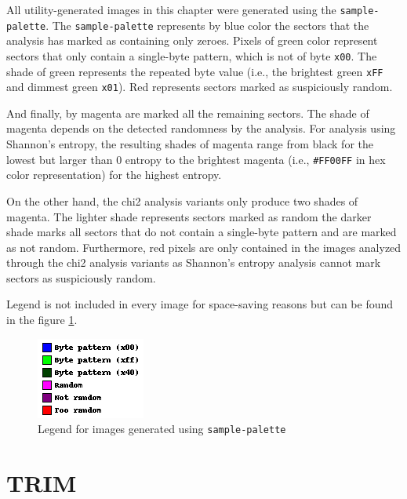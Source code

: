 \documentclass[
  digital, %
  oneside, %
  lof,     %
  lot,     %
]{fithesis4}
\begin{document}
All utility-generated images in this chapter were generated using the \texttt{sample-palette}.
The \texttt{sample-palette} represents by blue color the sectors that the analysis has marked as containing only zeroes.
Pixels of green color represent sectors that only contain a single-byte pattern, which is not of byte \texttt{x00}.
The shade of green represents the repeated byte value (i.e., the brightest green \texttt{xFF} and dimmest green \texttt{x01}).
Red represents sectors marked as suspiciously random. 

And finally, by magenta are marked all the remaining sectors. The shade of magenta depends on the detected randomness by the analysis. For analysis using Shannon's entropy, the resulting shades of magenta range from black for the lowest but larger than 0 entropy to the brightest magenta (i.e., \texttt{\#FF00FF} in hex color representation) for the highest entropy. 

On the other hand, the chi2 analysis variants only produce two shades of magenta. The lighter shade represents sectors marked as random the darker shade marks all sectors that do not contain a single-byte pattern and are marked as not random. Furthermore, red pixels are only contained in the images analyzed through the chi2 analysis variants as Shannon's entropy analysis cannot mark sectors as suspiciously random.

Legend is not included in every image for space-saving reasons but can be found in the figure \ref{fig:legend}.

\begin{figure}[H]
  \includegraphics[width=.45\textwidth,interpolate=true]{figures/legend.png}
  \caption{Legend for images generated using \texttt{sample-palette}}
  \label{fig:legend}
\end{figure}

\section{TRIM}
\end{document}
